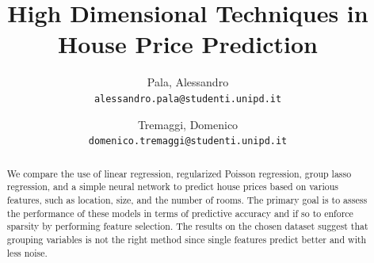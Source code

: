 \documentclass[a4paper, 12pt]{article}
\title{High Dimensional Techniques in House Price Prediction}
\author{
  Pala, Alessandro\\
  \texttt{alessandro.pala@studenti.unipd.it}
  \and
  Tremaggi, Domenico\\
  \texttt{domenico.tremaggi@studenti.unipd.it}
}
\date{}
\begin{document}
\maketitle
\noindent
\begin{abstract} We compare the use of linear regression, regularized Poisson regression, group lasso regression, and a simple neural network to predict house prices based on various features, such as location, size, and the number of rooms. The primary goal is to assess the performance of these models in terms of predictive accuracy and if so to enforce sparsity by performing feature selection. The results on the chosen dataset suggest that grouping variables is not the right method since single features predict better and with less noise.
\end{abstract}
\vspace{5pt}
\end{document}
